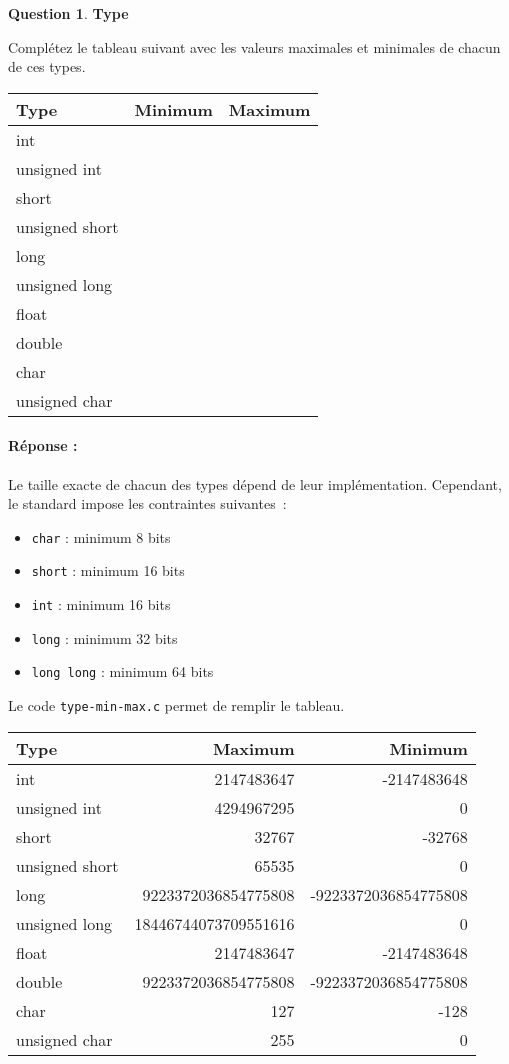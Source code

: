 \documentclass[11pt,a4paper,dvipsnames]{article}
\theoremstyle{definition}%
\newtheorem{Q}{Question}[] %
\newcommand{\reponse}[1]{%
	\ifthenelse {\boolean{corrige}} {\paragraph{Réponse :}
    \color{darkblue} #1 \color{black}} {}
 }
\begin{document}
\begin{Q} \textbf{Type}

Complétez le tableau suivant avec les valeurs maximales et minimales de chacun de ces types.
\begin{center}
	\begin{tabular}{|l|p{5cm}|p{5cm}|} \hline
	Type & Minimum & Maximum \\ \hline
	int & & \\ \hline
	unsigned int & & \\ \hline
	short & & \\ \hline
	unsigned short & & \\ \hline
	long & & \\ \hline
	unsigned long & & \\ \hline
	float & & \\ \hline
	double & & \\ \hline
	char & & \\ \hline
	unsigned char & & \\ \hline
	\end{tabular}
\end{center}

\reponse{
Le taille exacte de chacun des types dépend de leur implémentation.
Cependant, le standard impose les contraintes suivantes~:

\begin{itemize}
	\item \texttt{char} : minimum 8 bits
	\item \texttt{short} : minimum 16 bits
	\item \texttt{int} : minimum 16 bits
	\item \texttt{long} : minimum 32 bits
	\item \texttt{long long} : minimum 64 bits
\end{itemize}

Le code \texttt{type-min-max.c} permet de remplir le tableau.

\begin{center}
	\begin{tabular}{|l|r|r|} \hline
	Type & Maximum & Minimum \\ \hline
	int & 2147483647 & -2147483648 \\ \hline
	unsigned int & 4294967295 & 0 \\ \hline
	short & 32767 & -32768 \\ \hline
	unsigned short & 65535 & 0 \\ \hline
	long & 9223372036854775808 & -9223372036854775808 \\ \hline
	unsigned long & 18446744073709551616 & 0 \\ \hline
	float & 2147483647 & -2147483648 \\ \hline
	double & 9223372036854775808 & -9223372036854775808 \\ \hline
	char & 127 & -128 \\ \hline
	unsigned char & 255 & 0 \\ \hline
	\end{tabular}
\end{center}
}

\end{Q}
\end{document}
